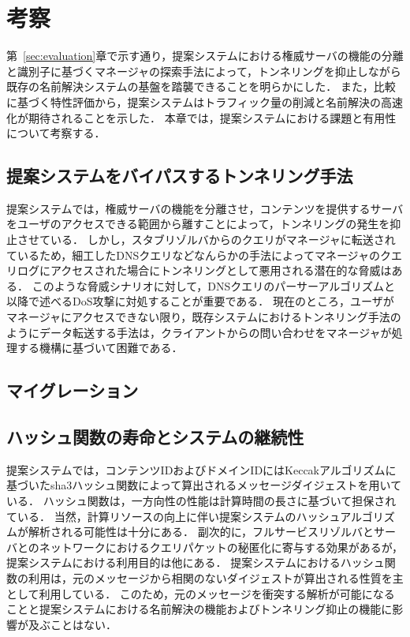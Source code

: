\section{考察}
第~\ref{sec:evaluation}章で示す通り，提案システムにおける権威サーバの機能の分離と識別子に基づくマネージャの探索手法によって，トンネリングを抑止しながら既存の名前解決システムの基盤を踏襲できることを明らかにした．
また，比較に基づく特性評価から，提案システムはトラフィック量の削減と名前解決の高速化が期待されることを示した．
本章では，提案システムにおける課題と有用性について考察する．

\subsection{提案システムをバイパスするトンネリング手法}
提案システムでは，権威サーバの機能を分離させ，コンテンツを提供するサーバをユーザのアクセスできる範囲から離すことによって，トンネリングの発生を抑止させている．
しかし，スタブリゾルバからのクエリがマネージャに転送されているため，細工したDNSクエリなどなんらかの手法によってマネージャのクエリログにアクセスされた場合にトンネリングとして悪用される潜在的な脅威はある．
このような脅威シナリオに対して，DNSクエリのパーサーアルゴリズムと以降で述べるDoS攻撃に対処することが重要である．
現在のところ，ユーザがマネージャにアクセスできない限り，既存システムにおけるトンネリング手法のようにデータ転送する手法は，クライアントからの問い合わせをマネージャが処理する機構に基づいて困難である．

\subsection{マイグレーション}

\subsection{ハッシュ関数の寿命とシステムの継続性}
提案システムでは，コンテンツIDおよびドメインIDにはKeccakアルゴリズムに基づいたsha3ハッシュ関数によって算出されるメッセージダイジェストを用いている．
ハッシュ関数は，一方向性の性能は計算時間の長さに基づいて担保されている．
当然，計算リソースの向上に伴い提案システムのハッシュアルゴリズムが解析される可能性は十分にある．
副次的に，フルサービスリゾルバとサーバとのネットワークにおけるクエリパケットの秘匿化に寄与する効果があるが，提案システムにおける利用目的は他にある．
提案システムにおけるハッシュ関数の利用は，元のメッセージから相関のないダイジェストが算出される性質を主として利用している．
このため，元のメッセージを衝突する解析が可能になることと提案システムにおける名前解決の機能およびトンネリング抑止の機能に影響が及ぶことはない．

